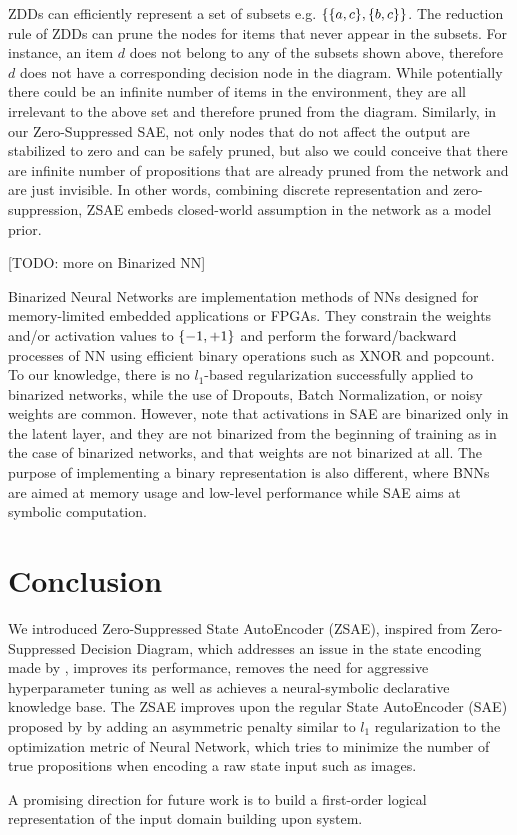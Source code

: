 ZDDs can efficiently represent a set of subsets e.g. ${\left\{{\left\{a,c\right\}},{\left\{b,c\right\}}\right\}}$.
The reduction rule of ZDDs can prune the nodes for items that never appear in the subsets.
For instance, an item $d$ does not belong to any of the subsets shown above, therefore $d$ does not have
a corresponding decision node in the diagram.
While potentially there could be an infinite number of items in the environment, they are 
all irrelevant to the above set and therefore pruned from the diagram.
% 
Similarly, in our Zero-Suppressed SAE, not only nodes that do not affect the output are stabilized to zero
and can be safely pruned, but also we could conceive that there are infinite number of propositions
that are already pruned from the network and are just invisible.
In other words, combining discrete representation and zero-suppression,
ZSAE embeds closed-world assumption in the network as a model prior.

[TODO: more on Binarized NN]

Binarized Neural Networks \cite{courbariaux2015binaryconnect,HubaraCSEB16,rastegari2016xnor}
 are implementation methods of NNs designed for
memory-limited embedded applications or FPGAs. They constrain the weights and/or activation
values to ${\left\{-1,+1\right\}}$ and perform the forward/backward processes of NN using
efficient binary operations such as XNOR and popcount.
To our knowledge, there is no $l_1$-based regularization successfully
applied to binarized networks, while the use of Dropouts, Batch Normalization, 
or noisy weights \cite{HubaraCSEB16} are common.
However, note that activations in SAE are binarized only in the latent layer,
and they are not binarized from the beginning of training
 as in the case of binarized networks, and that weights are not binarized at all.
The purpose of implementing a binary representation is also different, where BNNs
are aimed at memory usage and low-level performance while SAE aims at symbolic computation.

\section{Conclusion}
\label{conclusion}

We introduced Zero-Suppressed State AutoEncoder (ZSAE), inspired from
Zero-Suppressed Decision Diagram, which addresses an issue in the state
encoding made by \latentplanner, improves its performance, removes the need
for aggressive hyperparameter tuning as well as achieves a
neural-symbolic declarative knowledge base.  The ZSAE improves upon the
regular State AutoEncoder (SAE) proposed by \citeauthor{Asai2018} by
adding an asymmetric penalty similar to $l_1$ regularization to the optimization metric of
Neural Network, which tries to minimize the number of true propositions
when encoding a raw state input such as images.

A promising direction for future work is to build a first-order logical
representation of the input domain building upon \latentplanner system.

